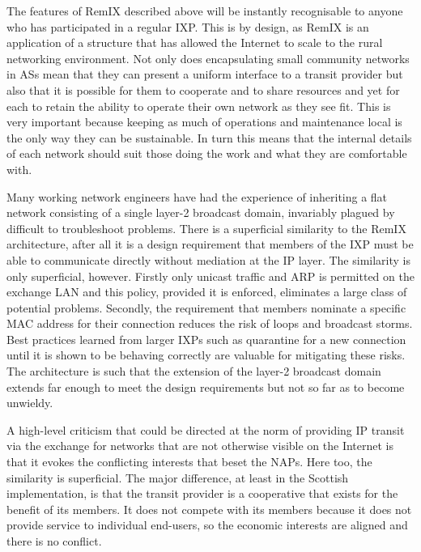 The features of RemIX described above will be instantly recognisable
to anyone who has participated in a regular \ac{IXP}. This is by
design, as RemIX is an application of a structure that has allowed the
Internet to scale to the rural networking environment. Not only does
encapsulating small community networks in \acp{AS} mean that they can
present a uniform interface to a transit provider but also that it is
possible for them to cooperate and to share resources and yet for each
to retain the ability to operate their own network as they see
fit. This is very important because keeping as much of operations and
maintenance local is the only way they can be sustainable. In turn
this means that the internal details of each network should suit those
doing the work and what they are comfortable with.

Many working network engineers have had the experience of inheriting a
flat network consisting of a single layer-2 broadcast domain,
invariably plagued by difficult to troubleshoot problems. There is a
superficial similarity to the RemIX architecture, after all it is a
design requirement that members of the \ac{IXP} must be able to
communicate directly without mediation at the IP layer. The similarity
is only superficial, however. Firstly only unicast traffic and
\ac{ARP} is permitted on the exchange \ac{LAN} and this policy,
provided it is enforced, eliminates a large class of potential
problems. Secondly, the requirement that members nominate a specific
\ac{MAC} address for their connection reduces the risk of loops and
broadcast storms. Best practices learned from larger \acp{IXP} such as
quarantine for a new connection until it is shown to be behaving
correctly are valuable for mitigating these risks. The architecture is
such that the extension of the layer-2 broadcast domain extends far
enough to meet the design requirements but not so far as to become
unwieldy.

A high-level criticism that could be directed at the norm of providing
IP transit via the exchange for networks that are not otherwise
visible on the Internet is that it evokes the conflicting interests
that beset the \acp{NAP}. Here too, the similarity is superficial. The
major difference, at least in the Scottish implementation, is that the
transit provider is a cooperative that exists for the benefit of its
members. It does not compete with its members because it does not
provide service to individual end-users, so the economic interests are
aligned and there is no conflict.
